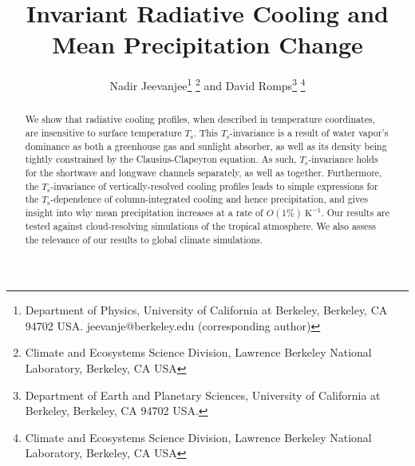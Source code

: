 \documentclass[10pt]{article}
\newcommand{\Ts}{\ensuremath{T_\mathrm{s}}}
\newcommand{\Kinverse}{\ensuremath{\mathrm{K^{-1}}}}
\begin{document}
%
%


\title{Invariant Radiative Cooling and Mean Precipitation Change}

%
%


 \author{Nadir Jeevanjee\footnote{Department of Physics, University of California at Berkeley, Berkeley, CA 94702  USA. jeevanje@berkeley.edu (corresponding author)} \footnote{Climate and Ecosystems Science Division, Lawrence Berkeley National Laboratory, Berkeley, CA USA} and David Romps\footnote{Department of Earth and Planetary Sciences, University of California at Berkeley, Berkeley, CA 94702  USA.} \footnote{Climate and Ecosystems Science Division, Lawrence Berkeley National Laboratory, Berkeley, CA USA}
}

\maketitle

\begin{abstract}
We show that radiative cooling profiles,  when described in temperature  coordinates, are insensitive to surface temperature \Ts. This \Ts-invariance is a result of water vapor's dominance as both a greenhouse gas and sunlight absorber, as well as its density being tightly constrained by the Clausius-Clapeyron equation. As such, \Ts-invariance holds for the shortwave and longwave channels separately, as well as together. Furthermore, the \Ts-invariance of vertically-resolved cooling profiles leads to simple expressions for the \Ts-dependence of column-integrated cooling and hence precipitation, and gives insight into why mean precipitation increases at a rate of $O(1\%)\ \Kinverse$.  Our results are tested against cloud-resolving simulations of the tropical atmosphere. We also assess the relevance of our results to global climate simulations.
%
%
\end{abstract}


%
%
\end{document}
